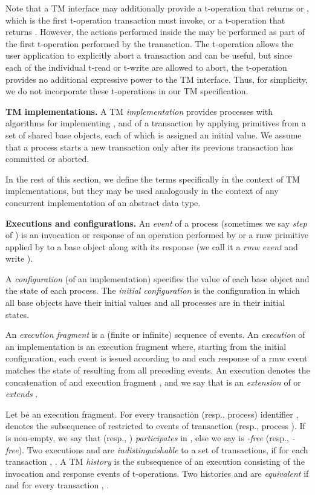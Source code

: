 Note that a TM interface may additionally provide a  t-operation that returns  or , 
which is the first t-operation
transaction  must invoke, or a  t-operation that returns .
However, the actions performed inside the  may be performed as part of the first t-operation performed
by the transaction. The  t-operation allows the user application
to explicitly abort a transaction and can be useful, but since each of the individual t-read or t-write are allowed to abort,
the  t-operation provides no additional expressive power to the TM interface.
Thus, for simplicity, we do not incorporate these t-operations in our TM specification.

\vspace{1mm}\noindent\textbf{TM implementations.}
A TM \emph{implementation} provides processes with algorithms
for implementing ,  and 
of a transaction  by applying primitives from a set of shared base objects, each of which is 
assigned an initial value.
We assume that a process starts a new transaction
only after its previous transaction has committed or aborted.

In the rest of this section, we define the terms specifically in the context of TM implementations, but
they may be used analogously in the context of any concurrent implementation of an abstract data type.

\vspace{1mm}\noindent\textbf{Executions and configurations.}
An \emph{event} of a process  (sometimes we say \emph{step} of )
is an invocation or response of an operation performed by  or a 
rmw primitive  applied by  to a base object 
along with its response  (we call it a \emph{rmw event} and write ).


A \emph{configuration} (of an implementation) specifies the value of each base object and 
the state of each process.
The \emph{initial configuration} is the configuration in which all 
base objects have their initial values and all processes are in their initial states.

An \emph{execution fragment} is a (finite or infinite) sequence of events.
An \emph{execution} of an implementation  is an execution
fragment where, starting from the initial configuration, each event is
issued according to  and each response of a rmw event  matches the state of  resulting from all
preceding events.
An execution  denotes the concatenation of  and execution fragment ,
and we say that  is an \emph{extension} of  or  \emph{extends} .

Let  be an execution fragment.
For every transaction (resp., process) identifier ,
 denotes the subsequence of  restricted to events of
transaction  (resp., process ).
If  is non-empty,
we say that  (resp., ) \emph{participates} in , else we say  is \emph{-free} (resp., \emph{-free}).
Two executions  and  are \emph{indistinguishable} to a set  of transactions, if
for each transaction , .
A TM \emph{history} is the subsequence of an execution consisting of the invocation and 
response events of t-operations.
Two histories  and  are \emph{equivalent} if 
and for every transaction , .

